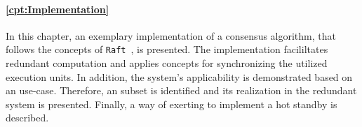 \paragraph{\autoref{cpt:Implementation}}
In this chapter, an exemplary implementation of a consensus algorithm, that follows the concepts of \texttt{Raft}~\cite{RaftConsensusPaper}, is presented.
The implementation facililtates redundant computation and applies  concepts for synchronizing the utilized execution units.
In addition, the system's applicability is demonstrated based on an  use-case.
Therefore, an  subset is identified and its realization in the redundant system is presented.
Finally, a way of exerting  to implement a hot standby is described.


